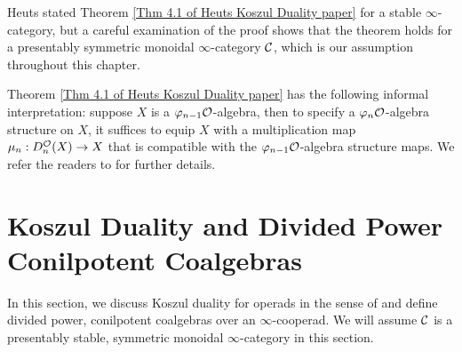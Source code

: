 \begin{remark}
Heuts stated Theorem \ref{Thm 4.1 of Heuts Koszul Duality paper} for a stable $\infty$-category, but a careful examination of the proof shows that the theorem holds for a presentably symmetric monoidal $\infty$-category ${\mathcal{C}}$, which is our assumption throughout this chapter.
\end{remark}

\begin{remark}
Theorem \ref{Thm 4.1 of Heuts Koszul Duality paper} has the following informal interpretation: suppose $X$ is a $\varphi_{n-1}{\mathcal{O}}$-algebra, then to specify a $\varphi_n{\mathcal{O}}$-algebra structure on $X$, it suffices to equip $X$ with a multiplication map $\mu_n: D^{{\mathcal{O}}}_n(X)\to X$ that is compatible with the $\varphi_{n-1}{\mathcal{O}}$-algebra structure maps. We refer the readers to \cite{Heuts_Koszul} for further details.
\end{remark}





\section{Koszul Duality and Divided Power Conilpotent  Coalgebras }
\label{Coalgebras over cooperads and Koszul Duality}
In this section, we discuss Koszul duality for operads in the sense of \cite{Ginzburg-Kapranov} and define divided power, conilpotent coalgebras over an $\infty$-cooperad. 
We will assume ${\mathcal{C}}$ is a presentably stable, symmetric monoidal $\infty$-category in this section.

